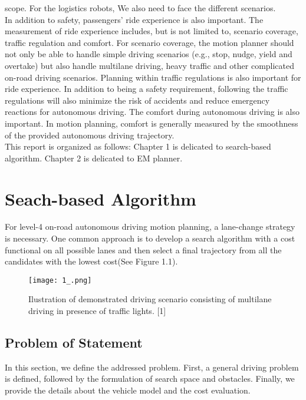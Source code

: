 \documentclass{report}
\begin{document}
 scope. For the logistics robots, We also need to face the different scenarios.\\
 \indent
 In addition to safety, passengers’ ride experience is also important. The measurement of ride experience includes, but is not limited to, scenario coverage, traffic regulation and comfort. For scenario coverage, the motion planner should not only be able to handle simple driving scenarios (e.g., stop, nudge, yield and overtake) but also handle multilane driving, heavy traffic and other complicated on-road driving scenarios.
 Planning within traffic regulations is also important for ride experience. In addition to being a safety requirement, following the traffic regulations will also minimize the risk of accidents and reduce emergency reactions for autonomous driving. The comfort during autonomous driving is also important. In motion planning, comfort is generally measured by the smoothness of the provided autonomous driving trajectory.\\
 \indent
 This report is organized as follows: Chapter 1 is delicated to search-based algorithm. Chapter 2 is delicated to EM planner.
 
 
 \chapter{Seach-based Algorithm}
 For level-4 on-road autonomous driving motion planning, a lane-change strategy is necessary. One common approach is to develop a search algorithm with a cost functional on all possible lanes and then
 select a final trajectory from all the candidates with the lowest cost(See Figure 1.1).
 \begin{figure}[ht]
 	\centering
 	\texttt{[image: 1\_.png]}
 	\caption{Ilustration of demonstrated driving scenario consisting of multilane driving in presence of traffic lights. [1]}
 	\label{fig:1.1} 
 \end{figure}
 \section{Problem of Statement}
 In this section, we define the addressed problem. First, a general driving problem is defined, followed by the formulation of search space and obstacles. Finally, we provide the details about the vehicle model and the cost evaluation.
\end{document}
